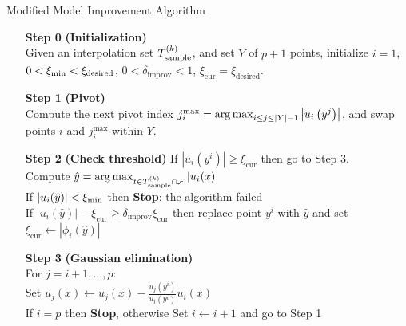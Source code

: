 \begin{algorithm}[H]
    \caption{Modified Model Improvement Algorithm}
    \label{modified_model_improving_algorithm}
    \begin{itemize}
        \item[\textbf{Step 0}] \textbf{(Initialization)} \\
            Given an interpolation set ${T_{\text{sample}}^{(k)}}$, and set $Y$ of $p+1$ points,
            initialize $i=1$, $0 < \xi_{\text{min}} < \xi_{\text{desired}}$, $0 <\delta_{\text{improv}} < 1$,
            $  \xi_{\text{cur}} = \xi_{\text{desired}}$.
            
		\item[\textbf{Step 1}] \textbf{(Pivot)} \\
			Compute the next pivot index $j^{\textrm{max}}_i = \operatorname*{arg\,max}_{i \le j \le |Y|-1} \left|u_i\left(y^j\right)\right|$,
			and swap points $i$ and $j^{\textrm{max}}_i$ within $Y$.
			
        \item[\textbf{Step 2}] \textbf{(Check threshold)}
                If $\left|u_i\left(y^i\right)\right| \ge \xi_{\text{cur}}$ then go to Step 3. \\
                Compute $ \hat y = \arg\max_{t \in {T_{\text{sample}}^{(k)}} \cap {\mathcal F}}\left|u_i(x)\right|$ \\
                If $ |u_i(\hat y)| < \xi_{\text{min}}$ then \textbf{Stop}: the algorithm failed \\
                If $|u_i(\hat y)| - \xi_{\text{cur}} \ge \delta_{\text{improv}} \xi_{\text{cur}}$ then
                replace point $y^i$ with $\hat y$ and set $\xi_{\text{cur}} \gets |\phi_i(\hat y)|$
                
        \item[\textbf{Step 3}] \textbf{(Gaussian elimination)} \\
        	For $j = i+1, \ldots, p$: \\
        	Set $u_j(x) \gets u_j(x) - \frac{u_j\left(y^i\right)}{u_i\left(y^i\right)} u_i(x)$ \\
            If $i = p$ then \textbf{Stop}, otherwise Set $i \gets i+1$ and go to Step 1
    \end{itemize}
\end{algorithm}


